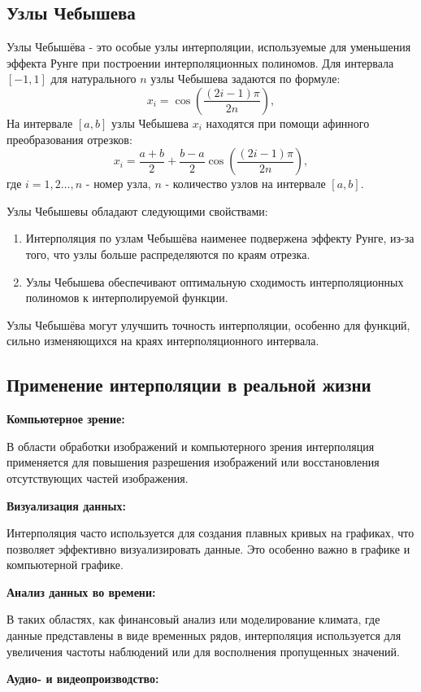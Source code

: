 \documentclass[13pt, a4paper, twoside]{article}
\begin{document}
\subsection{Узлы Чебышева}
\tab Узлы Чебышёва - это особые узлы интерполяции, используемые для уменьшения эффекта Рунге при построении интерполяционных полиномов.
Для интервала $[-1, 1]$ для натурального $n$ узлы Чебышева задаются по формуле:
\[
x_i = \cos\left(\frac{(2i - 1)\pi}{2n}\right),
\]
На интервале $[a, b]$ узлы Чебышева $x_i$ находятся при помощи афинного преобразования отрезков:
\[
x_i = \frac{a + b}{2} + \frac{b - a}{2} \cos\left(\frac{(2i - 1)\pi}{2n}\right),
\]
где $i = 1, 2 \ldots, n$ - номер узла, $n$ - количество узлов на интервале $[a, b]$.

Узлы Чебышевы обладают следующими свойствами:
\begin{enumerate}
    \item Интерполяция по узлам Чебышёва наименее подвержена эффекту Рунге, из-за того, что узлы больше распределяются по краям отрезка.
    \item Узлы Чебышева обеспечивают оптимальную сходимость интерполяционных полиномов к интерполируемой функции.
\end{enumerate}
Узлы Чебышёва могут улучшить точность интерполяции, особенно для функций, сильно изменяющихся на краях интерполяционного интервала.
\subsection{Применение интерполяции в реальной жизни}
\textbf{Компьютерное зрение:}

В области обработки изображений и компьютерного зрения интерполяция применяется для повышения разрешения изображений или восстановления отсутствующих частей изображения.


\textbf{Визуализация данных:}

Интерполяция часто используется для создания плавных кривых на графиках, что позволяет эффективно визуализировать данные. Это особенно важно в графике и компьютерной графике.

\textbf{Анализ данных во времени:}

В таких областях, как финансовый анализ или моделирование климата, где данные представлены в виде временных рядов, интерполяция используется для увеличения частоты наблюдений или для восполнения пропущенных значений.


   
\textbf{Аудио- и видеопроизводство:}
\end{document}
